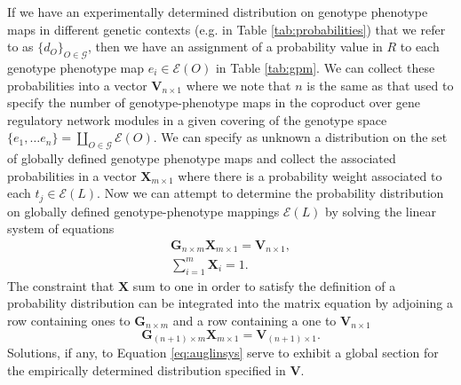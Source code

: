 \documentclass[10pt]{article}
\begin{document}
If we have an experimentally determined distribution on genotype phenotype maps in different genetic contexts (e.g. in Table \ref{tab:probabilities}) that we refer to as $\{d_O\}_{O \in \mathcal{G}}$, then we have an assignment of a probability value in $R$ to each genotype phenotype map $e_i \in \mathcal{E}(O)$ in Table \ref{tab:gpm}. We can collect these probabilities into a vector $\mathbf{V}_{n \times 1}$ where we note that $n$ is the same as that used to specify the number of genotype-phenotype maps in the coproduct over gene regulatory network modules in a given covering of the genotype space $\{e_1, \ldots e_n\} = \coprod_{O \in \mathcal{G}} \mathcal{E}(O)$. We can specify as unknown a distribution on the set of globally defined genotype phenotype maps and collect the associated probabilities in a vector $\mathbf{X}_{m \times 1}$ where there is a probability weight associated to each $t_j \in \mathcal{E}(L)$. Now we can attempt to determine the probability distribution on globally defined genotype-phenotype mappings $\mathcal{E}(L)$ by solving the linear system of equations
\begin{equation}
\begin{split}
\mathbf{G}_{n \times m} \mathbf{X}_{m \times 1} = \mathbf{V}_{n \times 1},\\
\sum_{i=1}^{m} \mathbf{X}_{i} = 1.
\end{split}
\end{equation}
The constraint that $\mathbf{X}$ sum to one in order to satisfy the definition of a probability distribution can be integrated into the matrix equation by adjoining a row containing ones to $\mathbf{G}_{n \times m}$ and a row containing a one to $\mathbf{V}_{n \times 1}$
\begin{equation}\label{eq:auglinsys}
\mathbf{G}_{(n + 1) \times m} \mathbf{X}_{m \times 1} = \mathbf{V}_{(n + 1) \times 1}.
\end{equation}
Solutions, if any, to Equation \ref{eq:auglinsys} serve to exhibit a global section for the empirically determined distribution specified in $\mathbf{V}$.
\end{document}
